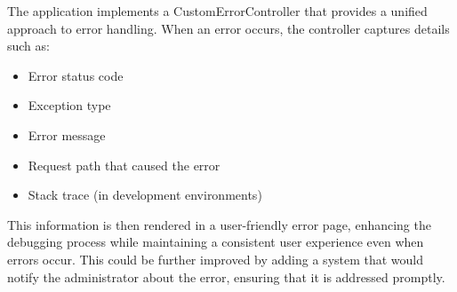 The application implements a CustomErrorController that provides a unified approach to error handling.
When an error occurs, the controller captures details such as:
\begin{itemize}
    \item Error status code
    \item Exception type
    \item Error message
    \item Request path that caused the error
    \item Stack trace (in development environments)
\end{itemize}

This information is then rendered in a user-friendly error page, enhancing the debugging process while maintaining a consistent user experience even when errors occur.
This could be further improved by adding a system that would notify the administrator about the error, ensuring that it is addressed promptly.
